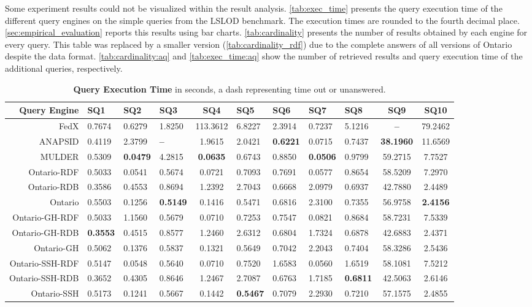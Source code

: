 Some experiment results could not be visualized within the result analysis.
\autoref{tab:exec_time} presents the query execution time of the different query engines on the simple queries from the LSLOD benchmark.
The execution times are rounded to the fourth decimal place.
\autoref{sec:empirical_evaluation} reports this results using bar charts.
\autoref{tab:cardinality} presents the number of results obtained by each engine for every query.
This table was replaced by a smaller version (\autoref{tab:cardinality_rdf}) due to the complete answers of all versions of Ontario despite the data format.
\autoref{tab:cardinality:aq} and \autoref{tab:exec_time:aq} show the number of retrieved results and query execution time of the additional queries, respectively.

\begin{sidewaystable}[!htbp]
    \centering
    \small
    \begin{tabularx}{\linewidth}{r Y Y Y c Y Y Y Y c c}
         \hline\textbf{Query Engine} &\textbf{SQ1} &\textbf{SQ2} &\textbf{SQ3} &\textbf{SQ4} &\textbf{SQ5} &\textbf{SQ6} &\textbf{SQ7} &\textbf{SQ8} &\textbf{SQ9} &\textbf{SQ10}\\\hline
         FedX &0.7674 &0.6279 &1.8250 &113.3612 &6.8227 &2.3914 &0.7237 &5.1216 &\textbf{--} &79.2462\\
         ANAPSID &0.4119 &2.3799 &\textbf{--} &1.9615 &2.0421 &\textbf{0.6221} &0.0715 &0.7437 &\textbf{38.1960} &11.6569\\
         MULDER &0.5309 &\textbf{0.0479} &4.2815 &\textbf{0.0635} &0.6743 &0.8850 &\textbf{0.0506} &0.9799 &59.2715 &7.7527\\\hline
         Ontario-RDF &0.5033 &0.0541 &0.5674 &0.0721 &0.7093 &0.7691 &0.0577 &0.8654 &58.5209 &7.2970\\
         Ontario-RDB &0.3586 &0.4553 &0.8694 &1.2392 &2.7043 &0.6668 &2.0979 &0.6937 &42.7880 &2.4489\\
         Ontario &0.5503 &0.1256 &\textbf{0.5149} &0.1416 &0.5471 &0.6816 &2.3100 &0.7355 &56.9758 &\textbf{2.4156}\\\hline
         Ontario-GH-RDF &0.5033 &1.1560 &0.5679 &0.0710 &0.7253 &0.7547 &0.0821 &0.8684 &58.7231 &7.5339\\
         Ontario-GH-RDB &\textbf{0.3553} &0.4515 &0.8577 &1.2460 &2.6312 &0.6804 &1.7324 &0.6878 &42.6883 &2.4371\\
         Ontario-GH &0.5062 &0.1376 &0.5837 &0.1321 &0.5649 &0.7042 &2.2043 &0.7404 &58.3286 &2.5436\\\hline
         Ontario-SSH-RDF &0.5147 &0.0548 &0.5640 &0.0710 &0.7520 &1.6583 &0.0560 &1.6519 &58.1081 &7.5212\\
         Ontario-SSH-RDB &0.3652 &0.4305 &0.8646 &1.2467 &2.7087 &0.6763 &1.7185 &\textbf{0.6811} &42.5063 &2.6146\\
         Ontario-SSH &0.5173 &0.1241 &0.5667 &0.1442 &\textbf{0.5467} &0.7079 &2.2930 &0.7210 &57.1575 &2.4855\\
    \end{tabularx}
    \caption[Query Execution Time]{\textbf{Query Execution Time} in seconds, a dash representing time out or unanswered.}
    \label{tab:exec_time}
\end{sidewaystable}

